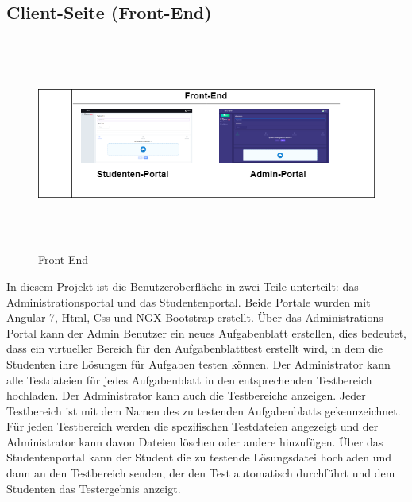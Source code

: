 \documentclass[a4paper,12pt,oneside]{book}
\begin{document}
\subsection{Client-Seite (Front-End)}
\begin{figure}[h!]
	\begin{center}
		\includegraphics[width=17.5cm, height=7cm]{FrontEnd.png}
		\caption{Front-End } 
		\label{ Front-End } 
	\end{center}
\end{figure}
In diesem Projekt ist die Benutzeroberfläche in zwei Teile unterteilt: das Administrationsportal und das Studentenportal. Beide Portale wurden mit Angular 7, Html, Css und NGX-Bootstrap erstellt.
Über das Administrations Portal kann der Admin Benutzer ein neues Aufgabenblatt erstellen, dies bedeutet, dass ein virtueller Bereich für den Aufgabenblatttest erstellt wird, in dem die Studenten ihre Lösungen für Aufgaben testen können. Der Administrator kann alle Testdateien für jedes Aufgabenblatt in den entsprechenden Testbereich hochladen. Der Administrator kann auch die Testbereiche anzeigen. Jeder Testbereich ist mit dem Namen des zu testenden Aufgabenblatts gekennzeichnet. Für jeden Testbereich werden die spezifischen Testdateien angezeigt und der Administrator kann davon Dateien löschen oder andere hinzufügen.
Über das Studentenportal kann der Student die zu testende Lösungsdatei hochladen und dann an den Testbereich senden, der den Test automatisch durchführt und dem Studenten das Testergebnis anzeigt.
\end{document}
